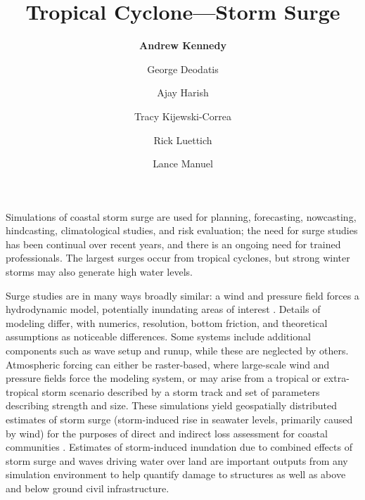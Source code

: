 %
%
%

\title{Tropical Cyclone---Storm Surge}
\author{
    \textbf{Andrew Kennedy}
    \and George Deodatis
    \and Ajay Harish
    \and Tracy Kijewski-Correa
    \and Rick Luettich
    \and Lance Manuel}
\tocauthor{}
%
%
\maketitle

Simulations of coastal storm surge are used for planning, forecasting, nowcasting, hindcasting, climatological studies, and risk evaluation; the need for surge studies has been continual over recent years, and there is an ongoing need for trained professionals. The largest surges occur from tropical cyclones, but strong winter storms may also generate high water levels.

Surge studies are in many ways broadly similar: a wind and pressure field forces a hydrodynamic model, potentially inundating areas of interest \citep{njcoast2018implementation}. Details of modeling differ, with numerics, resolution, bottom friction, and theoretical assumptions as noticeable differences. Some systems include additional components such as wave setup and runup, while these are neglected by others. Atmospheric forcing can either be raster-based, where large-scale wind and pressure fields force the modeling system, or may arise from a tropical or extra-tropical storm scenario described by a storm track and set of parameters describing strength and size. These simulations yield geospatially distributed estimates of storm surge (storm-induced rise in seawater levels, primarily caused by wind) for the purposes of direct and indirect loss assessment for coastal communities \citep{jacob2011responding}. Estimates of storm-induced inundation due to combined effects of storm surge and waves driving water over land are important outputs from any simulation environment to help quantify damage to structures as well as above and below ground civil infrastructure.

